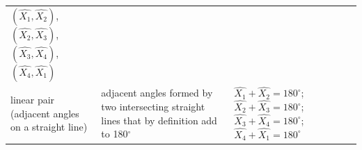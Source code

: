 {{\begin{center}
\begin{tabular}[t]{|l|l|l|}
        \begin{math}\left(\hat{{X}_{1}},\hat{{X}_{2}}\right)\end{math}, \begin{math}\left(\hat{{X}_{2}},\hat{{X}_{3}}\right)\end{math}, \begin{math}\left(\hat{{X}_{3}},\hat{{X}_{4}}\right)\end{math}, \begin{math}\left(\hat{{X}_{4}},\hat{{X}_{1}}\right)\end{math}%
     \tabularnewline\cline{1-1}\cline{2-2}\cline{3-3}
    
    
        linear pair (adjacent angles on a straight line) &
    
    
        adjacent angles formed by two intersecting straight lines that by definition add to 180\begin{math}{}^{\circ }\end{math} &
    
    
        
                  \begin{math}\hat{{X}_{1}}+\hat{{X}_{2}}={180}^{\circ }\end{math};
                  \begin{math}\hat{{X}_{2}}+\hat{{X}_{3}}={180}^{\circ }\end{math};
                  \begin{math}\hat{{X}_{3}}+\hat{{X}_{4}}={180}^{\circ }\end{math};
                  \begin{math}\hat{{X}_{4}}+\hat{{X}_{1}}={180}^{\circ }\end{math}
     \tabularnewline\cline{1-1}\cline{2-2}\cline{3-3}
    

\end{tabular}
\end{center}}}
